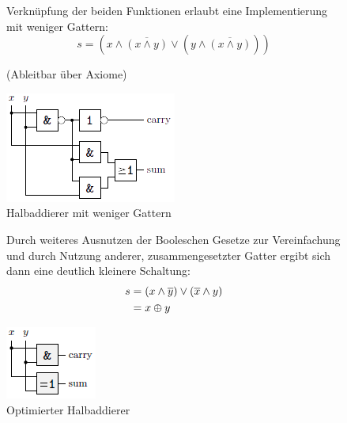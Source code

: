 \documentclass[12pt]{report}
\begin{document}
\begin{figure}[H]
  \begin{minipage}[t]{.45\textwidth}
    Verknüpfung der beiden Funktionen erlaubt eine Implementierung mit weniger Gattern:
    $$s = (x \wedge \overline{(x \wedge y)} \vee (y \wedge \overline{(x \wedge y)}))$$
    \begin{center}
      \small (Ableitbar über Axiome)
    \end{center}
  \end{minipage}
  \hfill
  \begin{minipage}[t]{.45\textwidth}
    \caption{Halbaddierer mit weniger Gattern}
    \centering
    \includegraphics{halbaddierer_02}
  \end{minipage}
\end{figure}

\begin{figure}[H]
  \begin{minipage}[t]{.45\textwidth}
    Durch weiteres Ausnutzen der Booleschen Gesetze zur Vereinfachung und
    durch Nutzung anderer, zusammengesetzter Gatter ergibt sich dann eine deutlich kleinere Schaltung:
    \begin{align*}
      \centering
      s 
       & = (x \wedge \overline{y}) \vee (\overline{x} \wedge y) \\
       & = x \oplus y                                           \\
    \end{align*}
  \end{minipage}
  \hfill
  \begin{minipage}[t]{.45\textwidth}
    \caption{Optimierter Halbaddierer}
    \centering
    \includegraphics[scale=1.3]{../graphics/halbaddierer_optimiert}
  \end{minipage}
\end{figure}
\end{document}
